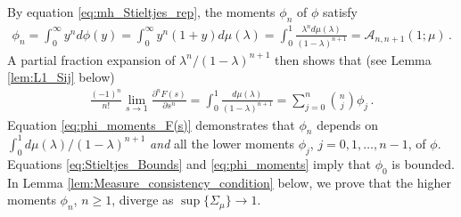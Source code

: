 \documentclass[english,12pt,jmp,graphicx]{revtex4-1}
\begin{document}
By equation \eqref{eq:mh_Stieltjes_rep}, the moments $\phi_n$ of $\phi$
satisfy  
%
\begin{align}\label{eq:phi_moments}
  \phi_n=\int_0^\infty y^nd\phi(y)
    =\int_0^\infty y^n(1+y)d\mu(\lambda)
    =\int_0^1\frac{\lambda^nd\mu(\lambda)}{(1-\lambda)^{n+1}}=\mathcal{A}_{n,n+1}(1;\mu)\,.
\end{align}
%
A partial fraction expansion of $\lambda^n/(1-\lambda)^{n+1}$ then shows that (see
Lemma \ref{lem:L1_Sij} below) 
%
\begin{align}\label{eq:phi_moments_F(s)}
  \frac{(-1)^n}{n!}\lim_{s\to1}\frac{\partial^nF(s)}{\partial s^n}=\int_0^1\frac{d\mu(\lambda)}{(1-\lambda)^{n+1}}
                                =\sum_{j=0}^n{n \choose j} \phi_j\,.
\end{align}
%
Equation \eqref{eq:phi_moments_F(s)} demonstrates that $\phi_n$ depends
on $\int_0^1d\mu(\lambda)/(1-\lambda)^{n+1}$ \emph{and} all the lower moments $\phi_j$,
$j=0,1,\ldots,n-1$, of $\phi$. Equations \eqref{eq:Stieltjes_Bounds} and
\eqref{eq:phi_moments} imply that $\phi_0$ is bounded. In Lemma
\ref{lem:Measure_consistency_condition} below, we prove that the  
higher moments $\phi_n$, $n\geq1$, diverge as $\sup\{\Sigma_\mu\}\to1$.
\end{document}
